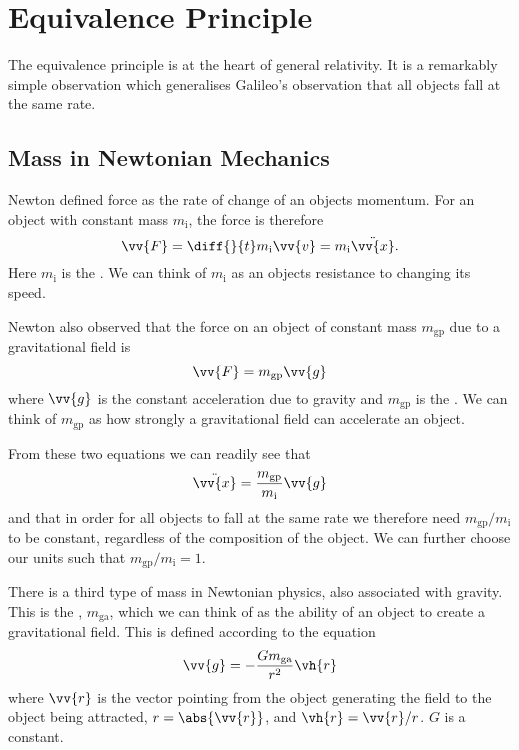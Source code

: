 \documentclass[fleqn]{NotesClass}
\begin{document}
    \section{Equivalence Principle}
    The equivalence principle is at the heart of general relativity.
    It is a remarkably simple observation which generalises Galileo's observation that all objects fall at the same rate.
    
    \subsection{Mass in Newtonian Mechanics}
    Newton defined force as the rate of change of an objects momentum.
    For an object with constant mass \(m_{\mathrm{i}}\), the force is therefore
    \begin{equation}
        \vv{F} = \diff{}{t} m_{\mathrm{i}}\vv{v} = m_{\mathrm{i}}\ddot{\vv{x}}.
    \end{equation}
    Here \(m_{\mathrm{i}}\) is the .
    We can think of \(m_{\mathrm{i}}\) as an objects resistance to changing its speed.
    
    Newton also observed that the force on an object of constant mass \(m_{\mathrm{gp}}\) due to a gravitational field is
    \begin{equation}
        \vv{F} = m_{\mathrm{gp}}\vv{g}
    \end{equation}
    where \(\vv{g}\) is the constant acceleration due to gravity and \(m_{\mathrm{gp}}\) is the .
    We can think of \(m_{\mathrm{gp}}\) as how strongly a gravitational field can accelerate an object.
    
    From these two equations we can readily see that
    \begin{equation}
        \ddot{\vv{x}} = \frac{m_{\mathrm{gp}}}{m_{\mathrm{i}}} \vv{g}
    \end{equation}
    and that in order for all objects to fall at the same rate we therefore need \(m_{\mathrm{gp}}/m_{\mathrm{i}}\) to be constant, regardless of the composition of the object.
    We can further choose our units such that \(m_{\mathrm{gp}}/m_{\mathrm{i}} = 1\).
    
    There is a third type of mass in Newtonian physics, also associated with gravity.
    This is the , \(m_{\mathrm{ga}}\), which we can think of as the ability of an object to create a gravitational field.
    This is defined according to the equation
    \begin{equation}
        \vv{g} = -\frac{Gm_{\mathrm{ga}}}{r^2}\vh{r}
    \end{equation}
    where \(\vv{r}\) is the vector pointing from the object generating the field to the object being attracted, \(r = \abs{\vv{r}}\), and \(\vh{r} = \vv{r}/r\).
    \(G\) is a constant.
    
\end{document}
